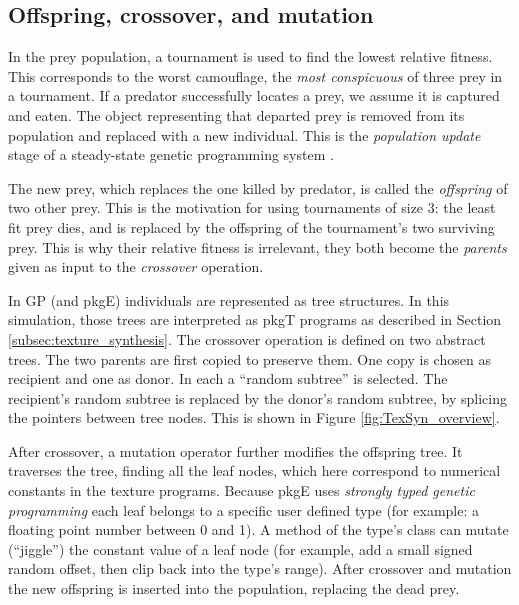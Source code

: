 \documentclass[acmtog]{acmart}
\newcommand{\jargon}[1]{\textit{#1}}
\newcommand{\texsyn}[0]{pkgT}
\newcommand{\lazypredator}[0]{pkgE}
\begin{document}

\subsection{Offspring, crossover, and mutation}
In the prey population, a tournament is used to find the lowest relative fitness. This corresponds to the worst camouflage, the \jargon{most conspicuous} of three prey in a tournament. If a predator successfully locates a prey, we assume it is captured and eaten. The object representing that departed prey is removed from its population and replaced with a new individual. This is the \jargon{population update} stage of a steady-state genetic programming system \cite{syswerda_study_1991}.
\par
The new prey, which replaces the one killed by predator, is called the \jargon{offspring} of two other prey. This is the motivation for using tournaments of size 3: the least fit prey dies, and is replaced by the offspring of the tournament's two surviving prey. This is why their relative fitness is irrelevant, they both become the \jargon{parents} given as input to the \jargon{crossover} operation.
\par
In GP (and \lazypredator{}) individuals are represented as tree structures. In this simulation, those trees are interpreted as \texsyn{} programs as described in Section \ref{subsec:texture_synthesis}. The crossover operation is defined on two abstract trees. The two parents are first copied to preserve them. One copy is chosen as recipient and one as donor. In each a “random subtree” is selected. The recipient's random subtree is replaced by the donor's random subtree, by splicing the pointers between tree nodes. This is shown in Figure \ref{fig:TexSyn_overview}.
\par
After crossover, a mutation operator further modifies the offspring tree. It traverses the tree, finding all the leaf nodes, which here correspond to numerical constants in the texture programs. Because \lazypredator{} uses \jargon{strongly typed genetic programming} \cite{montana_strongly_1995} each leaf belongs to a specific user defined type (for example: a floating point number between 0 and 1). A method of the type's class can mutate (“jiggle”) the constant value of a leaf node (for example, add a small signed random offset, then clip back into the type's range). After crossover and mutation the new offspring is inserted into the population, replacing the dead prey.
\par
\end{document}
